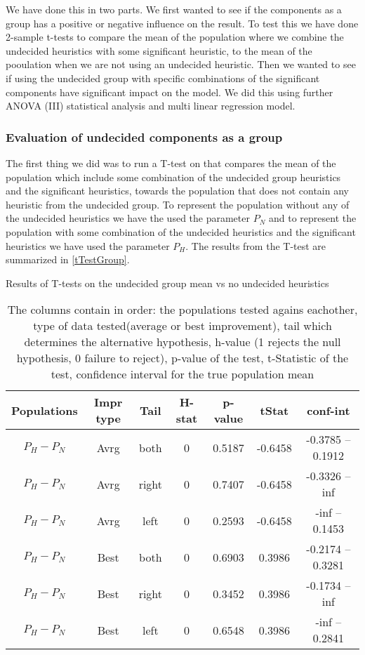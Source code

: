 \documentclass[../main.tex]{subfiles}
\begin{document}
We have done this in two parts.
We first wanted to see if the components as a group has a positive or negative influence on the result. 
To test this we have done 2-sample t-tests to compare the mean of the population where we combine the undecided heuristics with some significant heuristic, to the mean of the pooulation when we are not using an undecided heuristic. 
Then we wanted to see if using the undecided group with specific combinations of the significant components have significant impact on the model. 
We did this using further ANOVA (III) statistical analysis and multi linear regression model.

\subsubsection{Evaluation of undecided components as a group}
The first thing we did was to run a T-test on that compares the mean of the population which include some combination of the undecided group heuristics and the significant heuristics, towards the population that does not contain any heuristic from the undecided group. 
To represent the population without any of the undecided heuristics we have the used the parameter $P_N$ and to represent the population with some combination of the undecided heuristics and the significant heuristics we have used the parameter $P_H$.
The results from the T-test are summarized in \cref{tTestGroup}.

\begin{table}
    \centering
    \caption{Results of T-tests on the undecided group mean vs no undecided heuristics}
        \begin{tabular}{ccccccc}
        \hline
            Populations    & Impr type & Tail   &H-stat   & p-value    & tStat & conf-int \\ 
        \hline                
        $P_H-P_N$   & Avrg  & both  & 0 & 0.5187    & -0.6458   & -0.3785 -- 0.1912\\
        $P_H-P_N$   & Avrg  & right & 0 & 0.7407    & -0.6458   & -0.3326 -- inf   \\
        $P_H-P_N$   & Avrg  & left  & 0 & 0.2593    & -0.6458   & -inf -- 0.1453   \\
        $P_H-P_N$   & Best  & both  & 0 & 0.6903    & 0.3986    & -0.2174 -- 0.3281 \\
        $P_H-P_N$   & Best  & right & 0 & 0.3452    & 0.3986    & -0.1734 -- inf    \\
        $P_H-P_N$   & Best  & left  & 0 & 0.6548    & 0.3986    & -inf -- 0.2841    \\
       \hline
        \end{tabular}
    \caption*{The columns contain in order: the populations tested agains eachother, type of data tested(average or best improvement), tail which determines the alternative hypothesis, h-value (1 rejects the null hypothesis, 0 failure to reject), p-value of the test, t-Statistic of the test, confidence interval for the true population mean}
   \label{tab:tTestGroup}
\end{table}
\end{document}
